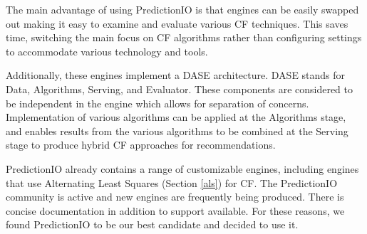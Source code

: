 The main advantage of using PredictionIO is that engines can be easily swapped out making it easy to examine and evaluate various CF techniques. This saves time, switching the main focus on CF algorithms rather than configuring settings to accommodate various technology and tools.

Additionally, these engines implement a DASE architecture. DASE stands for Data, Algorithms, Serving, and Evaluator. These components are considered to be independent in the engine which allows for separation of concerns. Implementation of various algorithms can be applied at the Algorithms stage, and enables results from the various algorithms to be combined at the Serving stage to produce hybrid CF approaches for recommendations.

PredictionIO already contains a range of customizable engines, including engines that use Alternating Least Squares (Section \ref{als}) for CF. The PredictionIO community is active and new engines are frequently being produced. There is concise documentation in addition to support available. For these reasons, we found PredictionIO to be our best candidate and decided to use it. 




